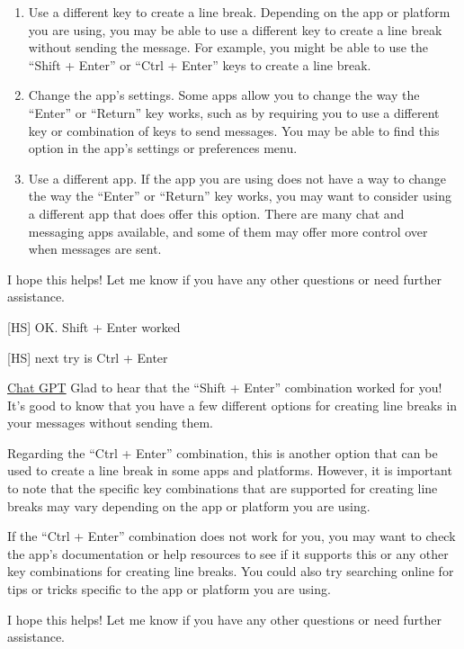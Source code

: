 \documentclass[
]{book}
\providecommand{\tightlist}{%
  \setlength{\itemsep}{0pt}\setlength{\parskip}{0pt}}
\theoremstyle{definition}
\theoremstyle{definition}
\theoremstyle{definition}
\theoremstyle{definition}
\theoremstyle{remark}
\begin{document}
\begin{enumerate}
\def\labelenumi{\arabic{enumi}.}
\tightlist
\item
  Use a different key to create a line break. Depending on the app or platform you are using, you may be able to use a different key to create a line break without sending the message. For example, you might be able to use the ``Shift + Enter'' or ``Ctrl + Enter'' keys to create a line break.
\item
  Change the app's settings. Some apps allow you to change the way the ``Enter'' or ``Return'' key works, such as by requiring you to use a different key or combination of keys to send messages. You may be able to find this option in the app's settings or preferences menu.
\item
  Use a different app. If the app you are using does not have a way to change the way the ``Enter'' or ``Return'' key works, you may want to consider using a different app that does offer this option. There are many chat and messaging apps available, and some of them may offer more control over when messages are sent.
\end{enumerate}

I hope this helps! Let me know if you have any other questions or need further assistance.

{[}HS{]} OK. Shift + Enter worked

{[}HS{]} next try is Ctrl + Enter

\protect\hyperlink{chatgpt}{Chat GPT} Glad to hear that the ``Shift + Enter'' combination worked for you! It's good to know that you have a few different options for creating line breaks in your messages without sending them.

Regarding the ``Ctrl + Enter'' combination, this is another option that can be used to create a line break in some apps and platforms. However, it is important to note that the specific key combinations that are supported for creating line breaks may vary depending on the app or platform you are using.

If the ``Ctrl + Enter'' combination does not work for you, you may want to check the app's documentation or help resources to see if it supports this or any other key combinations for creating line breaks. You could also try searching online for tips or tricks specific to the app or platform you are using.

I hope this helps! Let me know if you have any other questions or need further assistance.
\end{document}
